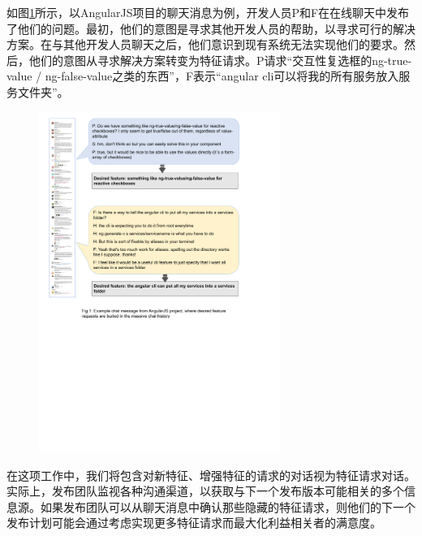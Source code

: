 如图\ref{fig:motivation}所示，以AngularJS项目的聊天消息为例，开发人员P和F在在线聊天中发布了他们的问题。最初，他们的意图是寻求其他开发人员的帮助，以寻求可行的解决方案。在与其他开发人员聊天之后，他们意识到现有系统无法实现他们的要求。然后，他们的意图从寻求解决方案转变为特征请求。P请求“交互性复选框的ng-true-value / ng-false-value之类的东西”，F表示“angular cli可以将我的所有服务放入服务文件夹”。
\begin{figure}[htbp]
    \centering
    \includegraphics[width=0.70\textwidth]{Img/motivation.pdf}
    \label{fig:motivation}
\end{figure}

在这项工作中，我们将包含对新特征、增强特征的请求的对话视为特征请求对话。实际上，发布团队监视各种沟通渠道，以获取与下一个发布版本可能相关的多个信息源。如果发布团队可以从聊天消息中确认那些隐藏的特征请求，则他们的下一个发布计划可能会通过考虑实现更多特征请求而最大化利益相关者的满意度。

